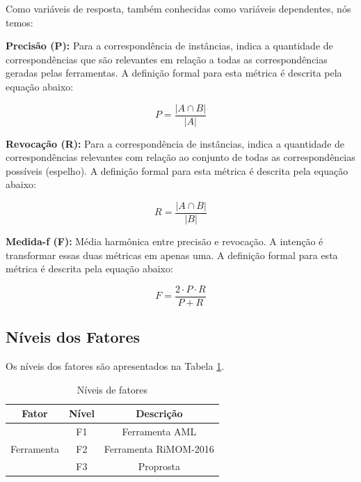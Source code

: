 Como variáveis de resposta, também conhecidas como variáveis dependentes, nós temos:

\textbf{Precisão (P):} Para a correspondência de instâncias, indica a quantidade de correspondências que são relevantes em relação a todas as correspondências geradas pelas ferramentas. A definição formal para esta métrica é descrita pela equação abaixo:

\begin{equation}
P = \dfrac{|{A}\cap{B}|}{|A|}
\end{equation}

\textbf{Revocação (R):} Para a correspondência de instâncias, indica a quantidade de correspondências relevantes com relação ao conjunto de todas as correspondências possíveis (espelho). A definição formal para esta métrica é descrita pela equação abaixo:

\begin{equation}
R = \dfrac{|{A}\cap{B}|}{|B|}
\end{equation}

\textbf{Medida-f (F):} Média harmônica entre precisão e revocação. A intenção é transformar essas duas métricas em apenas uma. A definição formal para esta métrica é descrita pela equação abaixo:

\begin{equation}
F = \dfrac{{2}\cdot{P}\cdot{R}}{P+R}
\end{equation}

\subsection{Níveis dos Fatores}
\label{sub:fator_nivel}
Os níveis dos fatores são apresentados na Tabela \ref{tab:factor_levels}.

\begin{table}[h]
	\centering
	\caption{Níveis de fatores}
	\label{tab:factor_levels}
	\begin{tabular}{|c|c|c|}
		\hline
		\textbf{Fator}        & \textbf{Nível} &  \textbf{Descrição}   \\ \hline
		\multirow{3}{*}{Ferramenta} &       F1       &    Ferramenta AML     \\ \cline{2-3}
		&       F2       & Ferramenta RiMOM-2016 \\ \cline{2-3}
		&       F3       &       Proprosta       \\ \hline
	\end{tabular}
\end{table}

